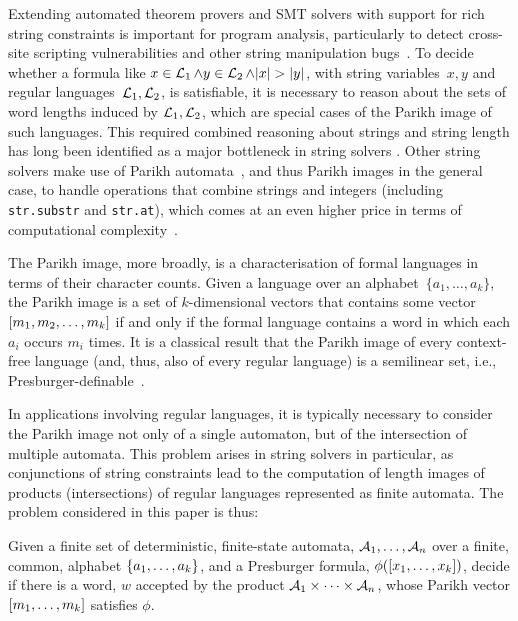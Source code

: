 Extending automated theorem provers and SMT solvers with support for rich string
constraints is important for program analysis, particularly to detect cross-site
scripting vulnerabilities and other string manipulation
bugs~\cite{DBLP:books/sp/BultanYAA17}.
%
To decide whether a formula like $x \in \operatorname{\mathcal{L}}_1 \wedge y \in \operatorname{\mathcal{L}}_2
\wedge |x| > |y|$, with string variables~$x, y$ and regular
languages~$\operatorname{\mathcal{L}}_1, \operatorname{\mathcal{L}}_2$, is satisfiable, it is necessary to reason
about the sets of word lengths induced by $\operatorname{\mathcal{L}}_1, \operatorname{\mathcal{L}}_2$, which are
special cases of the Parikh image of such languages.
This required combined reasoning about
strings and string length has long been identified as a major bottleneck in
string solvers
\cite{DBLP:conf/cav/AbdullaACHRRS15,length-aware-solver,approximate-parikh,DBLP:journals/corr/BerzishZG17}.
Other string solvers make use of Parikh automata~\cite{parikh-automata}, and
thus Parikh images in the general case, to handle operations that combine
strings and integers (including
\verb!str.substr!  and \verb!str.at!), which comes at an even higher price in
terms of computational complexity~\cite{ostrich-plus}.

The Parikh image, more broadly, is a characterisation of formal languages in
terms of their character counts. Given a language over an alphabet~$\{a_1,
\ldots, a_k\}$, the Parikh image is a set of $k$-dimensional vectors that
contains some vector~$\left[{m_1, m_2, \ldots, m_k}\right]$ if and only if the
formal language contains a word in which each $a_i$ occurs $m_i$ times. It is a
classical result that the Parikh image of every context-free language (and,
thus, also of every regular language) is a semilinear set,
i.e., Presburger-definable~\cite{parikh-theorem}.

In applications involving regular languages, it is typically necessary
to consider the Parikh image not only of a single automaton, but of the
intersection of multiple automata. This problem arises in string solvers in
particular, as conjunctions of string constraints lead to the computation of
length images of products (intersections) of regular languages represented as
finite automata. The problem considered in this paper is thus:

{
    \centering
    \begin{tcolorbox}[colback=gray!5!white,colframe=gray!75!black,%
        title=Satisfiability of Parikh images of a product of automata,%
        width=0.8\linewidth]
        Given a finite set of deterministic, finite-state automata, $\mathcal{A}_1, \ldots, \mathcal{A}_n$
        over a finite, common, alphabet $\left\{a_1, \ldots, a_k\right\}$,
        and a Presburger formula, $\phi(\left[{x_1, \ldots, x_k}\right])$, 
        decide if there is a word, $w$ accepted by the 
        product $\mathcal{A}_1 \times \cdots \times \mathcal{A}_n$, whose Parikh vector 
        $\left[{m_1, \ldots, m_k}\right]$ satisfies $\phi$.
    \end{tcolorbox}
  }

